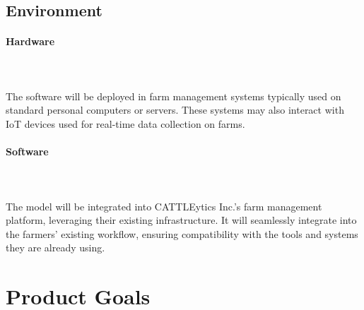 \documentclass{article}
\begin{document}
\subsection{Environment}

\paragraph{Hardware} \ \\
\\
The software will be deployed in farm management systems typically used on standard personal computers or servers. These systems may also interact with IoT devices used for real-time data collection on farms.
\paragraph{Software} \ \\
\\
The model will be integrated into CATTLEytics Inc.'s farm management platform,%
 leveraging their existing infrastructure. It will seamlessly integrate into the%
 farmers' existing workflow, ensuring compatibility with the tools and systems%
 they are already using.



\section{Product Goals}
\end{document}
